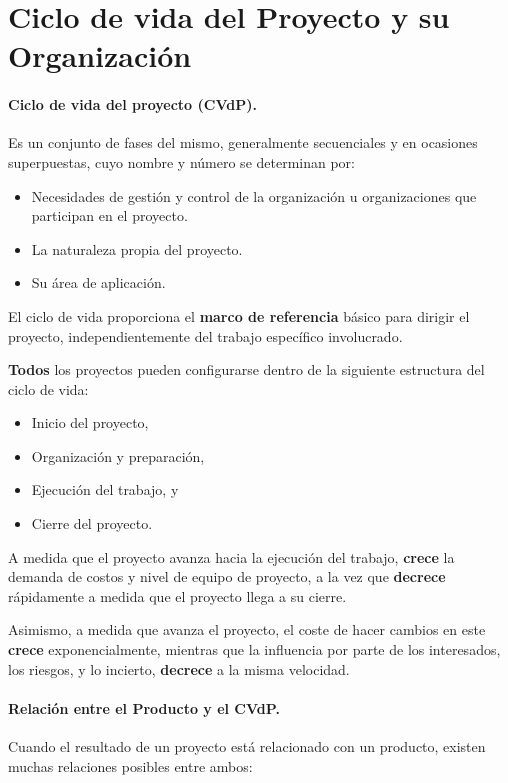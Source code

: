 \documentclass[10pt,a4paper]{article}
\begin{document}
\section{Ciclo de vida del Proyecto y su Organización}
\paragraph{Ciclo de vida del proyecto (CVdP).} Es un conjunto de fases del mismo, generalmente secuenciales y en ocasiones superpuestas, cuyo nombre y número se determinan por:

\begin{itemize}
\item Necesidades de gestión y control de la organización u organizaciones que participan en el proyecto.
\item La naturaleza propia del proyecto.
\item Su área de aplicación.
\end{itemize}

El ciclo de vida proporciona el \textbf{marco de referencia} básico para dirigir el proyecto, independientemente del trabajo específico involucrado.

\textbf{Todos} los proyectos pueden configurarse dentro de la siguiente estructura del ciclo de vida:
\begin{itemize}
\item Inicio del proyecto,
\item Organización y preparación,
\item Ejecución del trabajo, y
\item Cierre del proyecto.
\end{itemize}

A medida que el proyecto avanza hacia la ejecución del trabajo, \textbf{crece} la demanda de costos y nivel de equipo de proyecto, a la vez que \textbf{decrece} rápidamente a medida que el proyecto llega a su cierre. 

Asimismo, a medida que avanza el proyecto, el coste de hacer cambios en este \textbf{crece} exponencialmente, mientras que la influencia por parte de los interesados, los riesgos, y lo incierto, \textbf{decrece} a la misma velocidad.

\paragraph{Relación entre el Producto y el CVdP.} Cuando el resultado de un proyecto está relacionado con un producto, existen muchas relaciones posibles entre ambos:
\end{document}
